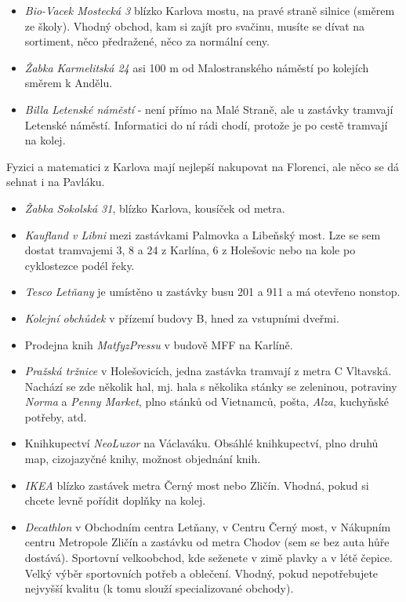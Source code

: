 \begin{itemize}
\item \textit{Bio-Vacek Mostecká 3} blízko Karlova mostu, na pravé straně
silnice (směrem ze školy). Vhodný obchod, kam si zajít pro svačinu, musíte se
dívat na sortiment, něco předražené, něco za normální ceny.
\item \textit{Žabka Karmelitská 24} asi 100 m od Malostranského náměstí po
kolejích směrem k Andělu.
\item \textit{Billa Letenské náměstí} - není přímo na Malé Straně, ale u
zastávky tramvají Letenské náměstí. Informatici do ní rádi chodí, protože je po
cestě tramvají na kolej.
\end{itemize}

Fyzici a matematici z Karlova mají nejlepší nakupovat na Florenci, ale něco se
dá sehnat i na Pavláku.
\begin{itemize}
\item \textit{Žabka Sokolská 31}, blízko Karlova, kousíček od metra.
\end{itemize}

\begin{itemize}
\item \textit{Kaufland v Libni} mezi zastávkami Palmovka a Libeňský most. Lze se
sem dostat tramvajemi 3, 8 a 24 z Karlína, 6 z Holešovic nebo na kole po cyklostezce podél řeky.
\item \textit{Tesco Letňany} je umístěno u zastávky busu 201 a 911 a má otevřeno
nonstop.
\item \textit{Kolejní obchůdek} v přízemí budovy B, hned za vstupními dveřmi.
\end{itemize}

\begin{itemize}
\item Prodejna knih \textit{MatfyzPressu} v budově MFF na Karlíně.
\item \textit{Pražská tržnice} v Holešovicích, jedna zastávka tramvají z metra C
Vltavská. Nachází se zde několik hal, mj. hala s několika stánky se zeleninou,
potraviny \textit{Norma} a \textit{Penny Market}, plno stánků od Vietnamců,
pošta, \textit{Alza}, kuchyňské potřeby, atd.
\item Knihkupectví \textit{ NeoLuxor} na Václaváku. Obsáhlé knihkupectví, plno
druhů map, cizojazyčné knihy, možnost objednání knih.
\item \textit{IKEA} blízko zastávek metra Černý most nebo Zličín. Vhodná, pokud
si chcete levně pořídit doplňky na kolej.
\item \textit{Decathlon} v Obchodním centra Letňany, v Centru Černý most, v Nákupním centru Metropole Zličín a zastávku od metra Chodov (sem se
bez auta hůře dostává). Sportovní velkoobchod, kde seženete v zimě plavky a v
létě čepice. Velký výběr sportovních potřeb a oblečení. Vhodný, pokud nepotřebujete
nejvyšší kvalitu (k tomu slouží specializované obchody).
\end{itemize}


